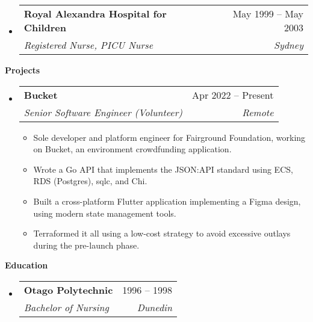 \documentclass[12pt]{article}
\makeatletter
\renewcommand{\section}[2]{\vspace{0.5ex}
  \colorbox{secondary}{\color{white}\raggedbottom\normalsize\textbf{{#1}{\hspace{0.5em}#2}}}
}
\newcommand{\resumeEntry}[1]{\begin{itemize}[leftmargin=2.5mm]#1\end{itemize}}
\newcommand{\resumeItemList}[1]{\begin{itemize}[leftmargin=4.5mm]#1\end{itemize}}
\newcommand{\resumeItem}[1]{
  \item\small{
    {#1 \vspace{-0.9ex}}
  }
}
\newcommand{\resumeEntryTSDL}[4]{
  \vspace{-0.5ex}\item[]
    \begin{tabularx}{0.97\textwidth}{X@{\hspace{5em}}r}
      \textbf{\color{primary}#1} & {\firabook\color{accent}\small#2} \\
      \textit{\color{accent}\small#3} & \textit{\color{accent}\small#4} \\
    \end{tabularx}\vspace{-0.9ex}
}
\makeatother
\begin{document}
  \resumeEntry{
    \resumeEntryTSDL
      {Royal Alexandra Hospital for Children}{May 1999 -- May 2003}
      {Registered Nurse, PICU Nurse}{Sydney}
  }

\section{\faFlask}{Projects}

  \resumeEntry{
    \resumeEntryTSDL
      {Bucket}{Apr 2022 -- Present}
      {Senior Software Engineer (Volunteer)}{Remote}
    \resumeItemList{
      \resumeItem {Sole developer and platform engineer for Fairground Foundation, working on Bucket, an environment crowdfunding application.}
      \resumeItem {Wrote a Go API that implements the JSON:API standard using ECS, RDS (Postgres), sqlc, and Chi.}
      \resumeItem {Built a cross-platform Flutter application implementing a Figma design, using modern state management tools.}
      \resumeItem {Terraformed it all using a low-cost strategy to avoid excessive outlays during the pre-launch phase.}
    }
  }

\section{\faGraduationCap}{Education}

  \resumeEntry{
    \resumeEntryTSDL
      {Otago Polytechnic}{1996 -- 1998}
      {Bachelor of Nursing}{Dunedin}
  }
\end{document}
